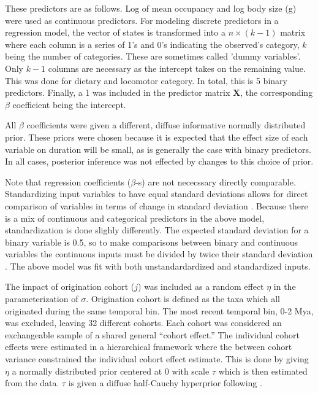\documentclass[12pt,letterpaper]{article}
\begin{document}
These predictors are as follows. Log of mean occupancy and log body size (g) were used as continuous predictors. For modeling discrete predictors in a regression model, the vector of states is transformed into a \(n \times (k - 1)\) matrix where each column is a series of 1's and 0's indicating the observed's category, \(k\) being the number of categories. These are sometimes called 'dummy variables'. Only \(k - 1\) columns are necessary as the intercept takes on the remaining value. This was done for dietary and locomotor category. In total, this is 5 binary predictors. Finally, a 1 was included in the predictor matrix \(\mathbf{X}\), the corresponding \(\beta\) coefficient being the intercept.

All \(\beta\) coefficients were given a different, diffuse informative normally distributed prior. These priors were chosen because it is expected that the effect size of each variable on duration will be small, as is generally the case with binary predictors. In all cases, posterior inference was not effected by changes to this choice of prior.

Note that regression coefficients (\(\beta\)-s) are not nececssary directly comparable. Standardizing input variables to have equal standard deviations allows for direct comparison of variables in terms of change in standard deviation \citep{Schielzeth2010}. Because there is a mix of continuous and categorical predictors in the above model, standardization is done slighly differently. The expected standard deviation for a binary variable is 0.5, so to make comparisons between binary and continuous variables the continuous inputs must be divided by twice their standard deviation \citep{Gelman2008}. The above model was fit with both unstandardardized and standardized inputs.

The impact of origination cohort (\(j\)) was included as a random effect \(\eta\) in the parameterization of \(\sigma\). Origination cohort is defined as the taxa which all originated during the same temporal bin. The most recent temporal bin, 0-2 Mya, was excluded, leaving 32 different cohorts. Each cohort was considered an exchangeable sample of a shared general ``cohort effect.'' The individual cohort effects were estimated in a hierarchical framework where the between cohort variance constrained the individual cohort effect estimate. This is done by giving \(\eta\) a normally distributed prior centered at 0 with scale \(\tau\) which is then estimated from the data. \(\tau\) is given a diffuse half-Cauchy hyperprior following \citet{Gelman2006a}.
\end{document}
